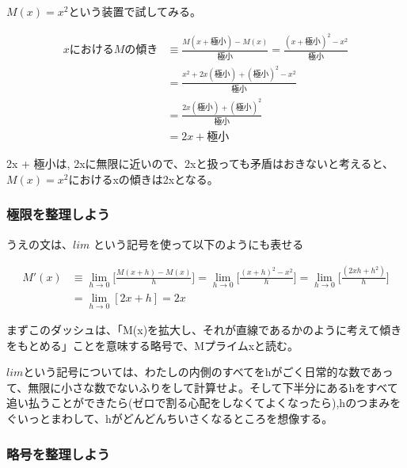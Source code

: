 \documentclass[dvipdfmx]{jsarticle}
\begin{document}
$M(x) = x^2$という装置で試してみる。

\begin{align*}
  xにおけるMの傾き &\equiv \frac{M(x + 極小) - M(x)}{極小} = \frac{(x + 極小)^2 - x^2}{極小} \\
  &= \frac{x^2 + 2x(極小) + (極小)^2 - x^2}{極小} \\
  &= \frac{2x(極小) + (極小)^2}{極小} \\
  &= 2x + 極小
\end{align*}

2x + 極小は, 2xに無限に近いので、2xと扱っても矛盾はおきないと考えると、$M(x) = x^2$におけるxの傾きは2xとなる。

\subsubsection{極限を整理しよう}

うえの文は、$lim$ という記号を使って以下のようにも表せる

\begin{align*}
  M'(x) &\equiv \lim_{h \to 0} \biggl[ \frac{M(x+h)-M(x)}{h}\biggr] = \lim_{h \to 0} \biggl[ \frac{(x+h)^2 -x^2}{h}\biggr] = \lim_{h \to 0} \biggl[ \frac{(2xh + h^2)}{h}\biggr] \\
  &= \lim_{h \to 0}[2x +h] = 2x
\end{align*}

まずこのダッシュは、「M(x)を拡大し、それが直線であるかのように考えて傾きをもとめる」ことを意味する略号で、Mプライムxと読む。

$lim$という記号については、わたしの内側のすべてをhがごく日常的な数であって、無限に小さな数でないふりをして計算せよ。そして下半分にあるhをすべて追い払うことができたら(ゼロで割る心配をしなくてよくなったら),hのつまみをぐいっとまわして、hがどんどんちいさくなるところを想像する。

\subsubsection{略号を整理しよう}
\end{document}
